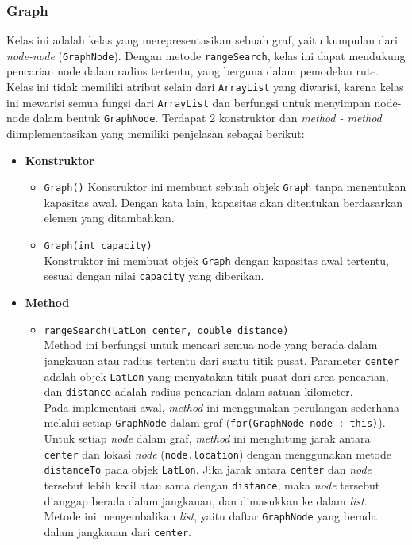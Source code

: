 \subsubsection{Graph}
\label{subss:graph}
Kelas ini adalah kelas yang merepresentasikan sebuah graf, yaitu kumpulan dari \textit{node-node} (\texttt{GraphNode}). Dengan metode \texttt{rangeSearch}, kelas ini dapat mendukung pencarian node dalam radius tertentu, yang berguna dalam pemodelan rute. Kelas ini tidak memiliki atribut selain dari \texttt{ArrayList} yang diwarisi, karena kelas ini mewarisi semua fungsi dari \texttt{ArrayList} dan berfungsi untuk menyimpan node-node dalam bentuk \texttt{GraphNode}. Terdapat 2 konstruktor dan \textit{method - method} diimplementasikan yang memiliki penjelasan sebagai berikut:
\begin{itemize}
    \item \textbf{Konstruktor}
    \begin{itemize}
        \item \texttt{Graph()}
        Konstruktor ini membuat sebuah objek \texttt{Graph} tanpa menentukan kapasitas awal. Dengan kata lain, kapasitas akan ditentukan berdasarkan elemen yang ditambahkan.
        \item \texttt{Graph(int capacity)}
        \\ Konstruktor ini membuat objek \texttt{Graph} dengan kapasitas awal tertentu, sesuai dengan nilai \texttt{capacity} yang diberikan.
    \end{itemize}
\newpage
    \item \textbf{Method}
    \begin{itemize}
        \item \texttt{rangeSearch(LatLon center, double distance)}
        \\ Method ini berfungsi untuk mencari semua node yang berada dalam jangkauan atau radius tertentu dari suatu titik pusat. Parameter \texttt{center} adalah objek \texttt{LatLon} yang menyatakan titik pusat dari area pencarian, dan \texttt{distance} adalah radius pencarian dalam satuan kilometer.
        \\ Pada implementasi awal, \textit{method} ini menggunakan perulangan sederhana melalui setiap \texttt{GraphNode} dalam graf (\texttt{for(GraphNode node : this)}). Untuk setiap \textit{node} dalam graf, \textit{method} ini menghitung jarak antara \texttt{center} dan lokasi \textit{node} (\texttt{node.location}) dengan menggunakan metode \texttt{distanceTo} pada objek \texttt{LatLon}. Jika jarak antara \texttt{center} dan \textit{node} tersebut lebih kecil atau sama dengan \texttt{distance}, maka \textit{node} tersebut dianggap berada dalam jangkauan, dan dimasukkan ke dalam \textit{list}. Metode ini mengembalikan \textit{list}, yaitu daftar \texttt{GraphNode} yang berada dalam jangkauan dari \texttt{center}.
    \end{itemize}
\end{itemize}

